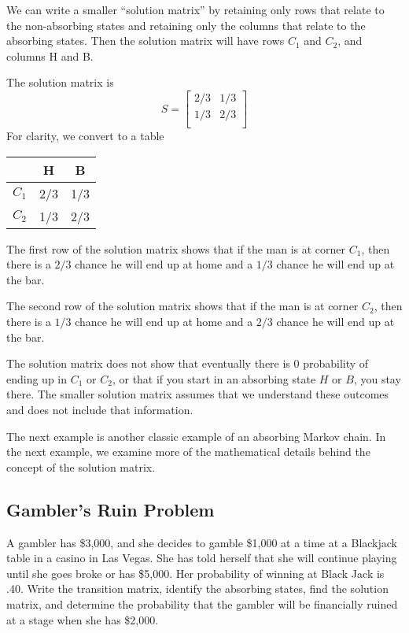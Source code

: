 \begin{solution}
    We can write a smaller “solution matrix” by retaining only rows that relate to the non-absorbing states and retaining only the columns that relate to the absorbing states. Then the solution matrix will have rows $C_1$ and $C_2$, and columns H and B.

    The solution matrix is
    \[
        S= \begin{bmatrix}
            2/3 & 1/3 \\
            1/3 & 2/3 \\
        \end{bmatrix}
    \]
    For clarity, we convert to a table
    \begin{center}
        \begin{tabular}{c|cc}
                  & H   & B   \\
            \hline
            $C_1$ & 2/3 & 1/3 \\
            $C_2$ & 1/3 & 2/3 \\
        \end{tabular}
    \end{center}

    The first row of the solution matrix shows that if the man is at corner $C_1$, then there is a $2/3$ chance he will end up at home and a $1/3$ chance he will end up at the bar.

    The second row of the solution matrix shows that if the man is at corner $C_2$, then there is a $1/3$ chance he will end up at home and a $2/3$ chance he will end up at the bar.

    The solution matrix does not show that eventually there is $0$ probability of ending up in $C_1$ or $C_2$, or that if you start in an absorbing state $H$ or $B$, you stay there. The smaller solution matrix assumes that we understand these outcomes and does not include that information.



\end{solution}

The next example is another classic example of an absorbing Markov chain. In the next example, we examine more of the mathematical details behind the concept of the solution matrix.

\subsection{Gambler's Ruin Problem}

\begin{example}\label{example_gamblers_ruin}
    A gambler has \$3,000, and she decides to gamble \$1,000 at a time at a Blackjack table in a casino in Las Vegas. She has told herself that she will continue playing until she goes broke or has \$5,000. Her probability of winning at Black Jack is .40.  Write the transition matrix, identify the absorbing states, find the solution matrix, and determine the probability that the gambler will be financially ruined at a stage when she has \$2,000.
\end{example}


